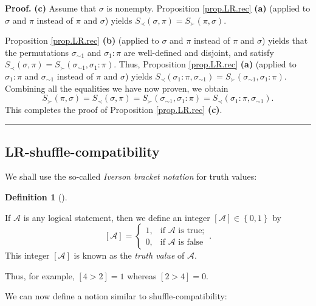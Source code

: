 \documentclass[numbers=enddot,12pt,final,onecolumn,notitlepage]{scrartcl}%
\theoremstyle{definition}
\newtheorem{defi}[theo]{Definition}
\newenvironment{definition}[1][]
{\begin{defi}[#1]\begin{leftbar}}
{\end{leftbar}\end{defi}}
\newenvironment{proof}[1][Proof]{\noindent\textbf{#1.} }{\ \rule{0.5em}{0.5em}}
\begin{document}
\begin{proof}
\textbf{(c)} Assume that $\sigma$ is nonempty. Proposition \ref{prop.LR.rec}
\textbf{(a)} (applied to $\sigma$ and $\pi$ instead of $\pi$ and $\sigma$)
yields $S_{\prec}\left(  \sigma,\pi\right)  =S_{\succ}\left(  \pi
,\sigma\right)  $.

Proposition \ref{prop.LR.rec} \textbf{(b)} (applied to $\sigma$ and $\pi$
instead of $\pi$ and $\sigma$) yields that the permutations $\sigma_{\sim1}$
and $\sigma_{1}:\pi$ are well-defined and disjoint, and satisfy $S_{\prec
}\left(  \sigma,\pi\right)  =S_{\succ}\left(  \sigma_{\sim1},\sigma_{1}%
:\pi\right)  $. Thus, Proposition \ref{prop.LR.rec} \textbf{(a)} (applied to
$\sigma_{1}:\pi$ and $\sigma_{\sim1}$ instead of $\pi$ and $\sigma$) yields
$S_{\prec}\left(  \sigma_{1}:\pi,\sigma_{\sim1}\right)  =S_{\succ}\left(
\sigma_{\sim1},\sigma_{1}:\pi\right)  $. Combining all the equalities we have
now proven, we obtain%
\[
S_{\succ}\left(  \pi,\sigma\right)  =S_{\prec}\left(  \sigma,\pi\right)
=S_{\succ}\left(  \sigma_{\sim1},\sigma_{1}:\pi\right)  =S_{\prec}\left(
\sigma_{1}:\pi,\sigma_{\sim1}\right)  .
\]
This completes the proof of Proposition \ref{prop.LR.rec} \textbf{(c)}.
\end{proof}

\subsection{LR-shuffle-compatibility}

We shall use the so-called \textit{Iverson bracket notation} for truth values:

\begin{definition}
\label{def.iverson}If $\mathcal{A}$ is any logical statement, then we define
an integer $\left[  \mathcal{A}\right]  \in\left\{  0,1\right\}  $ by%
\[
\left[  \mathcal{A}\right]  =%
\begin{cases}
1, & \text{if }\mathcal{A}\text{ is true};\\
0, & \text{if }\mathcal{A}\text{ is false}%
\end{cases}
.
\]
This integer $\left[  \mathcal{A}\right]  $ is known as the \textit{truth
value} of $\mathcal{A}$.
\end{definition}

Thus, for example, $\left[  4>2\right]  =1$ whereas $\left[  2>4\right]  =0$.

We can now define a notion similar to shuffle-compatibility:
\end{document}
